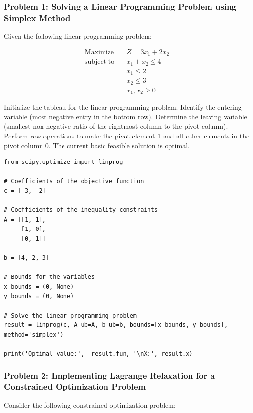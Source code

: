 \documentclass[12pt]{book} %
\begin{document}
\subsubsection*{Problem 1: Solving a Linear Programming Problem using Simplex Method}
Given the following linear programming problem:

\begin{align*}
\text{Maximize} \quad & Z = 3x_1 + 2x_2 \\
\text{subject to} \quad & x_1 + x_2 \leq 4 \\
& x_1 \leq 2 \\
& x_2 \leq 3 \\
& x_1, x_2 \geq 0
\end{align*}

\begin{algorithm}
\caption{Simplex Method}
\begin{algorithmic}[1]
\State Initialize the tableau for the linear programming problem.
    \State Identify the entering variable (most negative entry in the bottom row).
    \State Determine the leaving variable (smallest non-negative ratio of the rightmost column to the pivot column).
    \State Perform row operations to make the pivot element 1 and all other elements in the pivot column 0.
\EndWhile
\State The current basic feasible solution is optimal.
\end{algorithmic}
\end{algorithm}

\FloatBarrier

\begin{lstlisting}
from scipy.optimize import linprog

# Coefficients of the objective function
c = [-3, -2]

# Coefficients of the inequality constraints
A = [[1, 1],
     [1, 0],
     [0, 1]]

b = [4, 2, 3]

# Bounds for the variables
x_bounds = (0, None)
y_bounds = (0, None)

# Solve the linear programming problem
result = linprog(c, A_ub=A, b_ub=b, bounds=[x_bounds, y_bounds], method='simplex')

print('Optimal value:', -result.fun, '\nX:', result.x)
\end{lstlisting}

\FloatBarrier

\subsubsection*{Problem 2: Implementing Lagrange Relaxation for a Constrained Optimization Problem}
Consider the following constrained optimization problem:
\end{document}
